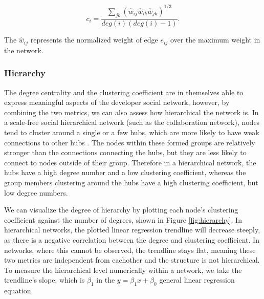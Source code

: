 \[ c_i = \frac{\sum_{jk}(\hat{w}_{ij}\hat{w}_{ik}\hat{w}_{jk})^{1/3}}{deg(i)(deg(i)-1)}. \]

The $\hat{w}_{ij}$ represents the normalized weight of edge $e_{ij}$ over the maximum weight in the network.

\subsubsection{Hierarchy}
\label{sec:hierarchy}

The degree centrality and the clustering coefficient are in themselves able to express meaningful aspects of the developer social network, however, by combining the two metrics, we can also assess how hierarchical the network is. In a scale-free social hierarchical network (such as the collaboration network), nodes tend to cluster around a single or a few hubs, which are more likely to have weak connections to other hubs \cite{ravaszHierarchicalOrganizationComplex2003, joblinEvolutionaryTrendsDeveloper2017}. The nodes within these formed groups are relatively stronger than the connections connecting the hubs, but they are less likely to connect to nodes outside of their group. Therefore in a hierarchical network, the hubs have a high degree number and a low clustering coefficient, whereas the group members clustering around the hubs have a high clustering coefficient, but low degree numbers.

We can visualize the degree of hierarchy by plotting each node's  clustering coefficient against the number of degrees, shown in Figure \ref{fig:hierarchy}. In hierarchical networks, the plotted linear regression trendline will decrease steeply, as there is a negative correlation between the degree and clustering coefficient. In networks, where this cannot be observed, the trendline stays flat, meaning these two metrics are independent from eachother and the structure is not hierarchical. To measure the hierarchical level numerically within a network, we take the trendline's slope, which is $\beta_1$ in the $y=\beta_1x + \beta_0$ general linear regression equation.

